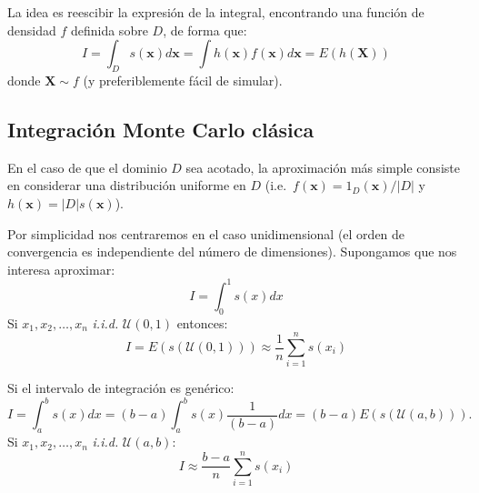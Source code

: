 \documentclass[
  10pt,
]{book}
\renewcommand{\mathbf}[1]{\symbf{#1}}
\theoremstyle{break}
\theoremstyle{nonumberplain}
\begin{document}
La idea es reescibir la expresión de la integral, encontrando una función de densidad \(f\) definida sobre \(D\), de forma que:
\[I = \int _D s(\mathbf{x}) d \mathbf{x} = \int h(\mathbf{x})f(\mathbf{x}) d \mathbf{x} = E\left( h(\mathbf{X}) \right)\]
donde \(\mathbf{X} \sim f\) (y preferiblemente fácil de simular).

\hypertarget{integraciuxf3n-monte-carlo-cluxe1sica}{%
\subsection{Integración Monte Carlo clásica}\label{integraciuxf3n-monte-carlo-cluxe1sica}}

En el caso de que el dominio \(D\) sea acotado, la aproximación más simple consiste en considerar una distribución uniforme en \(D\) (i.e.~\(f(\mathbf{x})=1_D(\mathbf{x})/|D|\) y \(h(\mathbf{x}) = |D|s(\mathbf{x})\)).

Por simplicidad nos centraremos en el caso unidimensional (el orden de convergencia es independiente del número de dimensiones).
Supongamos que nos interesa aproximar:
\[I = \int_0^1 s(x) dx\]
Si \(x_1,x_2,\ldots ,x_n\) \emph{i.i.d.} \(\mathcal{U}(0, 1)\)
entonces:
\[I = E\left( s\left( \mathcal{U}(0, 1) \right) \right)
\approx \frac{1}{n}\sum\limits_{i=1}^n s\left( x_i\right)\]

Si el intervalo de integración es genérico:
\[I = \int_a^b s(x) dx = 
(b-a)\int_a^b s(x) \frac1{(b-a)}dx = 
(b-a)E\left( s\left( \mathcal{U}(a, b) \right) \right).\]
Si \(x_1,x_2,\ldots ,x_n\) \emph{i.i.d.} \(\mathcal{U}(a, b)\):
\[I \approx \frac{b-a}{n}\sum\limits_{i=1}^n s\left( x_i\right)\]
\end{document}
